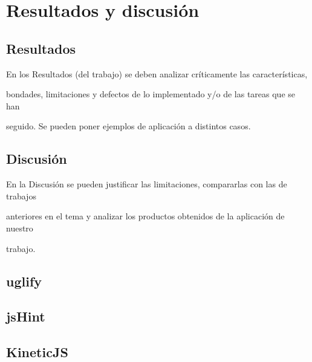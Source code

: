 \newpage\mbox{}\thispagestyle{empty}

\chapter{Resultados y discusión}

\section{Resultados}
En los Resultados (del trabajo) se deben analizar críticamente las características, 

bondades, limitaciones y defectos de lo implementado y/o de las tareas que se han 

seguido. Se pueden poner ejemplos de aplicación a distintos casos.

\section{Discusión}

En la Discusión se pueden justificar las limitaciones, compararlas con las de trabajos 

anteriores en el tema y analizar los productos obtenidos de la aplicación de nuestro 

trabajo.




\section{uglify}
\section{jsHint}
\section{KineticJS}

%